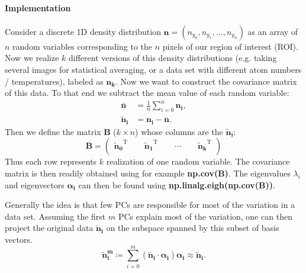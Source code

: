 \documentclass[
oneside,titlepage,numbers=noenddot,headinclude,%
footinclude=true,cleardoublepage=empty,
BCOR=5mm,paper=a4,fontsize=11pt, %
american %
]{scrartcl}
\begin{document}
\paragraph{Implementation}
Consider a discrete 1D density distribution $\bm{n} = (n_{y_0},n_{y_1},...,n_{y_n})$ as an array of $n$ random variables corresponding to the $n$ pixels of our region of interest (ROI). Now we realize $k$ different versions of this density distributions (e.g. taking several images for statistical averaging, or a data set with different atom numbers / temperatures), labeled as $\bm{n_k}$. Now we want to construct the covariance matrix of this data. To that end we subtract the mean value of each random variable:
\begin{align}
	\bm{\bar{n}} &= \frac{1}{n}\sum_{i=0}^{n}\bm{n_i},\\
	\bm{\tilde{n}_i} &= \bm{n_i} - \bm{\bar{n}}.
\end{align}
Then we define the matrix $\bm{B}$ ($k\times n$) whose columns are the $\bm{\tilde{n}_i}$:
\begin{equation}
\bm{B}= \begin{pmatrix}
	\bm{\tilde{n}_0}^\mathrm{T}\qquad \bm{\tilde{n}_1}^\mathrm{T} \qquad  \cdots  \qquad\bm{\tilde{n}_k}^\mathrm{T}\\
\end{pmatrix}
\end{equation}
Thus each row represents $k$ realization of one random variable. The covariance matrix is then readily obtained using for example \textbf{np.cov(B)}. The eigenvalues $\lambda_i$ and eigenvectors $\bm{\alpha_i}$ can then be found using \textbf{np.linalg.eigh(np.cov(B))}.

Generally the idea is that few PCs are responsible for most of the variation in a data set. Assuming the first $m$ PCs explain most of the variation, one can then project the original data $\bm{\tilde{n}_i}$ on the subspace spanned by this subset of basis vectors.
\begin{equation}
	\bm{\tilde{n}_i^m}\coloneqq \sum_{i=0}^{m}(\bm{\tilde{n}_i}\cdot\bm{\alpha_i})\bm{\alpha_i} \approx \bm{\tilde{n}_i} .
	\label{eq:reconstruct}
\end{equation}
\end{document}

